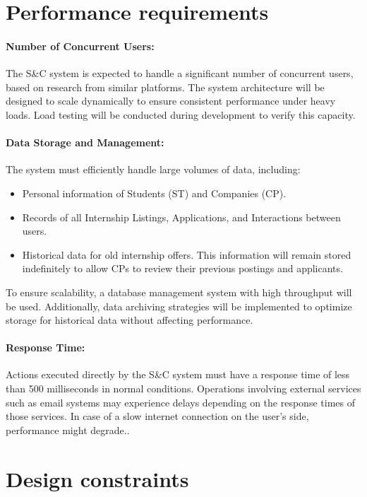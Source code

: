 \section{Performance requirements}
\label{sec:performance_requirements}%

\paragraph{Number of Concurrent Users:}
The S\&C system is expected to handle a significant number of concurrent users, based on research from similar platforms. The system architecture will be designed to scale dynamically to ensure consistent performance under heavy loads. Load testing will be conducted during development to verify this capacity.

\paragraph{Data Storage and Management:}
The system must efficiently handle large volumes of data, including:
\begin{itemize}
    \item Personal information of Students (ST) and Companies (CP).
    \item Records of all Internship Listings, Applications, and Interactions between users.
    \item Historical data for old internship offers. This information will remain stored indefinitely to allow CPs to review their previous postings and applicants.
\end{itemize}
To ensure scalability, a database management system with high throughput will be used. Additionally, data archiving strategies will be implemented to optimize storage for historical data without affecting performance.

\paragraph{Response Time:}
Actions executed directly by the S\&C system must have a response time of less than 500 milliseconds in normal conditions. Operations involving external services such as email systems may experience delays depending on the response times of those services. In case of a slow internet connection on the user's side, performance might degrade..

\section{Design constraints}
\label{sec:design_constraints}%

